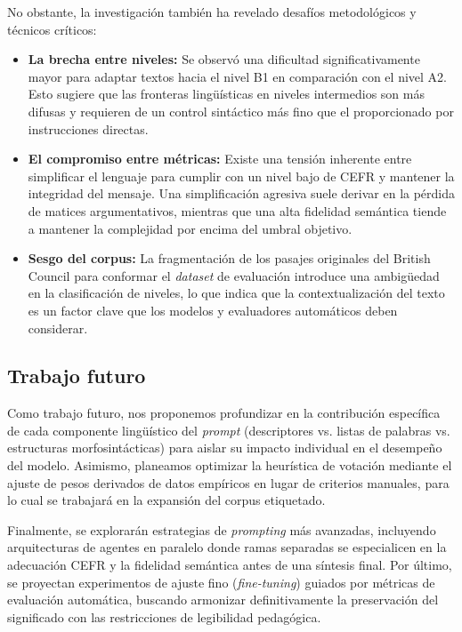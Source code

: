 No obstante, la investigación también ha revelado desafíos metodológicos y técnicos críticos:
\begin{itemize}
\item \textbf{La brecha entre niveles:} Se observó una dificultad significativamente mayor para adaptar textos hacia el nivel B1 en comparación con el nivel A2. Esto sugiere que las fronteras lingüísticas en niveles intermedios son más difusas y requieren de un control sintáctico más fino que el proporcionado por instrucciones directas.
\item \textbf{El compromiso entre métricas:} Existe una tensión inherente entre simplificar el lenguaje para cumplir con un nivel bajo de CEFR y mantener la integridad del mensaje. Una simplificación agresiva suele derivar en la pérdida de matices argumentativos, mientras que una alta fidelidad semántica tiende a mantener la complejidad por encima del umbral objetivo.
\item \textbf{Sesgo del corpus:} La fragmentación de los pasajes originales del British Council para conformar el \textit{dataset} de evaluación introduce una ambigüedad en la clasificación de niveles, lo que indica que la contextualización del texto es un factor clave que los modelos y evaluadores automáticos deben considerar.
\end{itemize}

\subsection{Trabajo futuro}
Como trabajo futuro, nos proponemos profundizar en la contribución específica de cada componente lingüístico del \textit{prompt} (descriptores vs. listas de palabras vs. estructuras morfosintácticas) para aislar su impacto individual en el desempeño del modelo. Asimismo, planeamos optimizar la heurística de votación mediante el ajuste de pesos derivados de datos empíricos en lugar de criterios manuales, para lo cual se trabajará en la expansión del corpus etiquetado.

Finalmente, se explorarán estrategias de \textit{prompting} más avanzadas, incluyendo arquitecturas de agentes en paralelo donde ramas separadas se especialicen en la adecuación CEFR y la fidelidad semántica antes de una síntesis final. Por último, se proyectan experimentos de ajuste fino (\textit{fine-tuning}) guiados por métricas de evaluación automática, buscando armonizar definitivamente la preservación del significado con las restricciones de legibilidad pedagógica.

